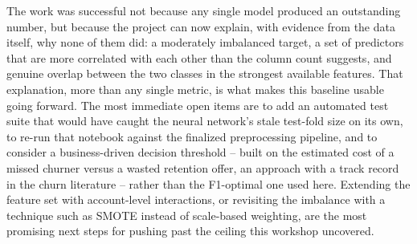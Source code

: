 \documentclass{article}
\begin{document}
The work was successful not because any single model produced an outstanding number, but because the project can now explain, with evidence from the data itself, why none of them did: a moderately imbalanced target, a set of predictors that are more correlated with each other than the column count suggests, and genuine overlap between the two classes in the strongest available features. That explanation, more than any single metric, is what makes this baseline usable going forward. The most immediate open items are to add an automated test suite that would have caught the neural network's stale test-fold size on its own, to re-run that notebook against the finalized preprocessing pipeline, and to consider a business-driven decision threshold -- built on the estimated cost of a missed churner versus a wasted retention offer, an approach with a track record in the churn literature \cite{verbeke2012} -- rather than the F1-optimal one used here. Extending the feature set with account-level interactions, or revisiting the imbalance with a technique such as SMOTE \cite{chawla2002smote} instead of scale-based weighting, are the most promising next steps for pushing past the ceiling this workshop uncovered.
\end{document}
